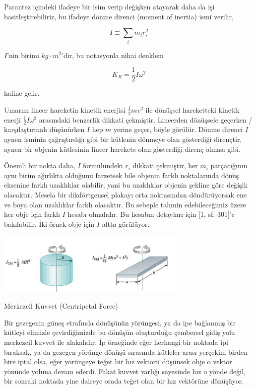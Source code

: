 \documentclass[12pt,fleqn]{article}\usepackage{../../common}
\begin{document}
Parantez içindeki ifadeye bir isim verip değişken atayarak daha da işi
basitleştirebiliriz, bu ifadeye dönme direnci (moment of inertia) ismi
verilir,

$$
I \equiv  \sum_i m_i r_i^2
$$

$I$'nin birimi $kg \cdot m^2$'dir, bu notasyonla nihai denklem

$$
K_R = \frac{1}{2} I \omega^2
$$

haline gelir. 

Umarım lineer hareketin kinetik enerjisi $\frac{1}{2} m v^2$ ile dönüşsel
hareketteki kinetik enerji $\frac{1}{2} I \omega^2$ arasındaki benzerlik
dikkati çekmiştir. Lineerden dönüşsele geçerken / karşılaştırmalı
düşünürken $I$ hep $m$ yerine geçer, böyle görülür. Dönme direnci $I$ aynen
isminin çağrıştırdığı gibi bir kütlenin dönmeye olan gösterdiği dirençtir,
aynen bir objenin kütlesinin lineer harekete olan gösterdiği direnç olması
gibi. 

Önemli bir nokta daha, $I$ formülündeki $r_i$ dikkati çekmiştir, her $m_i$
parçacığının aynı birim ağırlıkta olduğunu farzetsek bile objenin farklı
noktalarında dönüş eksenine farklı uzaklıklar olabilir, yani bu uzaklıklar
objenin şekline göre değişik olacaktır. Mesela bir dikdörtgensel plakayı
orta noktasından döndürüyorsak ene ve boya olan uzaklıklar farklı
olacaktır. Bu sebeple tahmin edebileceğimiz üzere her obje için farklı $I$
hesabı olmalıdır. Bu hesabın detayları için [1, sf. 301]'e bakılabilir. İki
örnek obje için $I$ altta görülüyor.

\includegraphics[width=25em]{phy_005_basics_02_11.jpg}

Merkezcil Kuvvet (Centripetal Force)

Bir gezegenin güneş etrafında dönüşünün yörüngesi, ya da ipe bağlanmış bir
kütleyi elimizle çevirdiğimizde bu dönüşün oluşturduğu çembersel gidiş yolu
merkezcil kuvvet ile alakalıdır. İp örneğinde eğer herhangi bir noktada ipi
bıraksak, ya da gezegen yörünge dönüşü sırasında kütleler arası yerçekim birden
bire iptal olsa, eğer yörüngeye teğet bir hız vektörü düşünsek obje o vektör
yönünde yoluna devam ederdi. Fakat kuvvet varlığı sayesinde hız o yönde değil,
bir sonraki noktada yine daireye orada teğet olan bir hız vektörüne
dönüşüyor.
\end{document}
